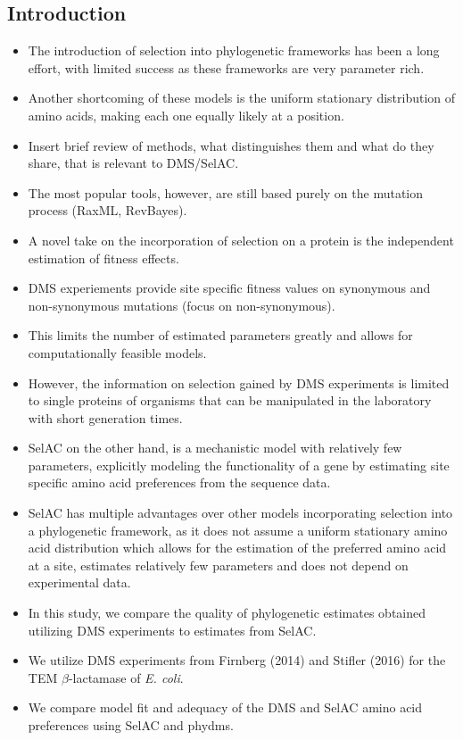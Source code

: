 \documentclass[12pt]{article}
\begin{document}
\subsection*{Introduction}
\begin{itemize}
	\item The introduction of selection into phylogenetic frameworks has been a long effort, with limited success as these frameworks are very parameter rich.
	\item Another shortcoming of these models is the uniform stationary distribution of amino acids, making each one equally likely at a position.
	\item Insert brief review of methods, what distinguishes them and what do they share, that is relevant to DMS/SelAC.
	\item The most popular tools, however, are still based purely on the mutation process (RaxML, RevBayes). 
	\item A novel take on the incorporation of selection on a protein is the independent estimation of fitness effects.
	\item DMS experiements provide site specific fitness values on synonymous and non-synonymous mutations (focus on non-synonymous).
	\item This limits the number of estimated parameters greatly and allows for computationally feasible models.
	\item However, the information on selection gained by DMS experiments is limited to single proteins of organisms that can be manipulated in the laboratory with short generation times. 
	\item SelAC on the other hand, is a mechanistic model with relatively few parameters, explicitly modeling the functionality of a gene by estimating site specific amino acid preferences from the sequence data.
	\item SelAC has multiple advantages over other models incorporating selection into a phylogenetic framework, as it does not assume a uniform stationary amino acid distribution which allows for the estimation of the preferred amino acid at a site, estimates relatively few parameters and does not depend on experimental data.
	\item In this study, we compare the quality of phylogenetic estimates obtained utilizing DMS experiments to estimates from SelAC.
	\item We utilize DMS experiments from Firnberg (2014) and Stifler (2016) for the TEM $\beta$-lactamase of \textit{E. coli}.
	\item We compare model fit and adequacy of the DMS and SelAC amino acid preferences using SelAC and phydms.

\end{itemize}
\end{document}
